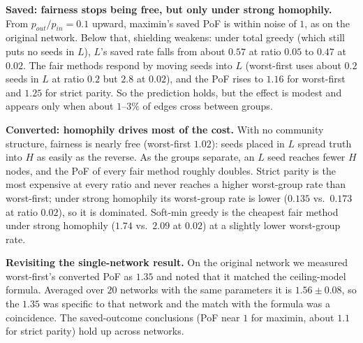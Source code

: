 \textbf{Saved: fairness stops being free, but only under strong homophily.} From $p_{out}/p_{in}=0.1$ upward, maximin's saved PoF is within noise of $1$, as on the original network. Below that, shielding weakens: under total greedy (which still puts no seeds in $L$), $L$'s saved rate falls from about $0.57$ at ratio $0.05$ to $0.47$ at $0.02$. The fair methods respond by moving seeds into $L$ (worst-first uses about $0.2$ seeds in $L$ at ratio $0.2$ but $2.8$ at $0.02$), and the PoF rises to $1.16$ for worst-first and $1.25$ for strict parity. So the prediction holds, but the effect is modest and appears only when about $1$--$3\%$ of edges cross between groups.

\textbf{Converted: homophily drives most of the cost.} With no community structure, fairness is nearly free (worst-first $1.02$): seeds placed in $L$ spread truth into $H$ as easily as the reverse. As the groups separate, an $L$ seed reaches fewer $H$ nodes, and the PoF of every fair method roughly doubles. Strict parity is the most expensive at every ratio and never reaches a higher worst-group rate than worst-first; under strong homophily its worst-group rate is lower ($0.135$ vs.\ $0.173$ at ratio $0.02$), so it is dominated. Soft-min greedy is the cheapest fair method under strong homophily ($1.74$ vs.\ $2.09$ at $0.02$) at a slightly lower worst-group rate.

\textbf{Revisiting the single-network result.} On the original network we measured worst-first's converted PoF as $1.35$ and noted that it matched the ceiling-model formula. Averaged over $20$ networks with the same parameters it is $1.56{\pm}0.08$, so the $1.35$ was specific to that network and the match with the formula was a coincidence. The saved-outcome conclusions (PoF near $1$ for maximin, about $1.1$ for strict parity) hold up across networks.
